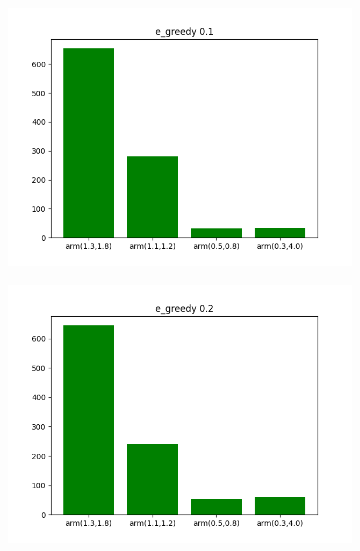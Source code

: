 \documentclass[letterpaper]{article}
\begin{document}
\begin{figure}[H]
\begin{subfigure}{.5\textwidth}
    \caption{}
    \label{fig:arms_e_greedy0_ex2}
  \end{subfigure}
  \begin{subfigure}{.5\textwidth}
    \centering
    \includegraphics[width=1\linewidth]{images/assign3/ex2/arms_e_greedy01}
    \caption{}
    \label{fig:arms_e_greedy01_ex2}
  \end{subfigure}
  \begin{subfigure}{.5\textwidth}
    \centering
    \includegraphics[width=1\linewidth]{images/assign3/ex2/arms_e_greedy02}
    \caption{}
    \label{fig:arms_e_greedy02_ex2}
  \end{subfigure}
  \begin{subfigure}{.5\textwidth}
    \centering

\end{subfigure}
\end{figure}
\end{document}
